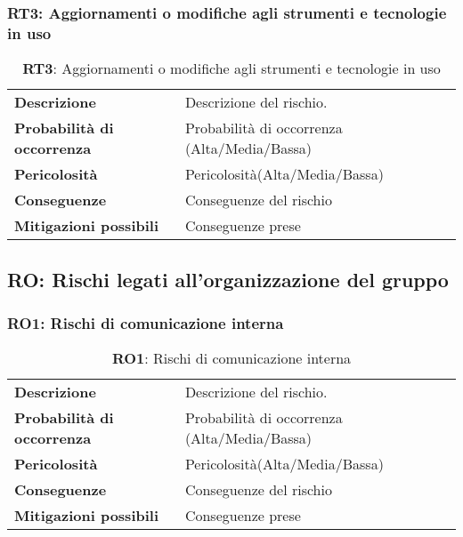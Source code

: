 \subsubsection{RT3: Aggiornamenti o modifiche agli strumenti e tecnologie in uso}
\begin{table}[h!]
    \centering
    \renewcommand{\arraystretch}{1.5} %
    \begin{tabularx}{\textwidth}{|X|X|}\hline
    \rowcolor[HTML]{FFD700} 
    \multicolumn{2}{|c|}{\textbf{Aggiornamenti o modifiche agli strumenti e tecnologie in uso}} \\ \hline
    \textbf{Descrizione} & Descrizione del rischio. \\ \hline
    \textbf{Probabilità di occorrenza} & Probabilità di occorrenza (Alta/Media/Bassa) \\ \hline
    \textbf{Pericolosità} & Pericolosità(Alta/Media/Bassa) \\ \hline
    \textbf{Conseguenze} & Conseguenze del rischio \\ \hline
    \textbf{Mitigazioni possibili} & Conseguenze prese \\ \hline
    \end{tabularx}
    \caption{\textbf{RT3}: Aggiornamenti o modifiche agli strumenti e tecnologie in uso}
    \end{table}

\newpage

\subsection{RO: Rischi legati all'organizzazione del gruppo}

\subsubsection{RO1: Rischi di comunicazione interna}
\begin{table}[h!]
    \centering
    \renewcommand{\arraystretch}{1.5} %
    \begin{tabularx}{\textwidth}{|X|X|}\hline
    \rowcolor[HTML]{FFD700} 
    \multicolumn{2}{|c|}{\textbf{Rischi di comunicazione interna}} \\ \hline
    \textbf{Descrizione} & Descrizione del rischio. \\ \hline
    \textbf{Probabilità di occorrenza} & Probabilità di occorrenza (Alta/Media/Bassa) \\ \hline
    \textbf{Pericolosità} & Pericolosità(Alta/Media/Bassa) \\ \hline
    \textbf{Conseguenze} & Conseguenze del rischio \\ \hline
    \textbf{Mitigazioni possibili} & Conseguenze prese \\ \hline
    \end{tabularx}
    \caption{\textbf{RO1}: Rischi di comunicazione interna}
    \end{table}

